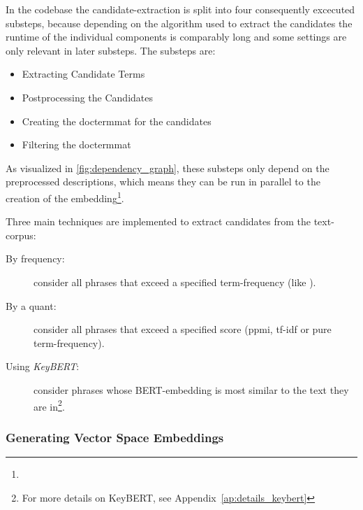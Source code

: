 In the codebase the candidate-extraction is split into four consequently excecuted substeps, because depending on the algorithm used to extract the candidates the runtime of the individual components is comparably long and some settings are only relevant in later substeps. The substeps are:
\begin{itemize}
	\item Extracting Candidate Terms
	\item Postprocessing the Candidates
	\item Creating the \gls{doctermmat} for the candidates
	\item Filtering the \gls{doctermmat}
\end{itemize}

As visualized in \autoref{fig:dependency_graph}, these substeps only depend on the preprocessed descriptions, which means they can be run in parallel to the creation of the embedding\footnote{}.

Three main techniques are implemented to extract candidates from the text-corpus: 
\begin{description}
	\item[By frequency:] consider all phrases that exceed a specified term-frequency (like \cite{Derrac2015}).
	\item[By a \gls{quant}:] consider all phrases that exceed a specified score (\gls{ppmi}, \gls{tf-idf} or pure term-frequency).
	\item[Using \emph{KeyBERT}\cite{grootendorst2020keybert}:] consider phrases whose BERT-embedding \cite{Devlin2019} is most similar to the text they are in\footnote{For more details on KeyBERT, see Appendix~\ref{ap:details_keybert}}.
\end{description}



\subsubsection{Generating Vector Space Embeddings}

\label{sec:generate_vectorspaces}

